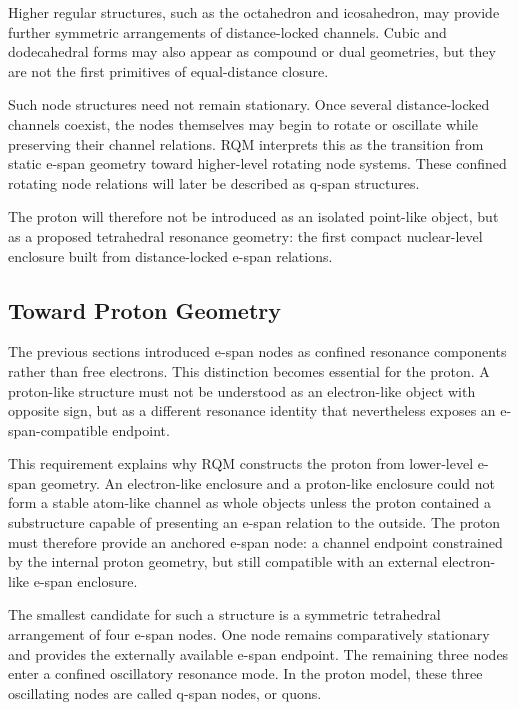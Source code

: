 \documentclass[11pt,a4paper]{article}
\begin{document}
Higher regular structures, such as the octahedron and icosahedron, may provide further symmetric arrangements of distance-locked channels. Cubic and dodecahedral forms may also appear as compound or dual geometries, but they are not the first primitives of equal-distance closure.

Such node structures need not remain stationary. Once several distance-locked channels coexist, the nodes themselves may begin to rotate or oscillate while preserving their channel relations. RQM interprets this as the transition from static e-span geometry toward higher-level rotating node systems. These confined rotating node relations will later be described as q-span structures.

The proton will therefore not be introduced as an isolated point-like object, but as a proposed tetrahedral resonance geometry: the first compact nuclear-level enclosure built from distance-locked e-span relations.



\subsection{Toward Proton Geometry}

The previous sections introduced e-span nodes as confined resonance components rather than free electrons. This distinction becomes essential for the proton. A proton-like structure must not be understood as an electron-like object with opposite sign, but as a different resonance identity that nevertheless exposes an e-span-compatible endpoint.

This requirement explains why RQM constructs the proton from lower-level e-span geometry. An electron-like enclosure and a proton-like enclosure could not form a stable atom-like channel as whole objects unless the proton contained a substructure capable of presenting an e-span relation to the outside. The proton must therefore provide an anchored e-span node: a channel endpoint constrained by the internal proton geometry, but still compatible with an external electron-like e-span enclosure.

The smallest candidate for such a structure is a symmetric tetrahedral arrangement of four e-span nodes. One node remains comparatively stationary and provides the externally available e-span endpoint. The remaining three nodes enter a confined oscillatory resonance mode. In the proton model, these three oscillating nodes are called q-span nodes, or quons.
\end{document}
